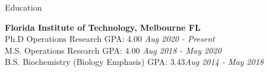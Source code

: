 \documentclass{resume} %
\begin{document}


\begin{rSection}{Education}

    {\bf Florida Institute of Technology, Melbourne FL}
    \\ Ph.D Operations Research  GPA: 4.00 \hfill {\em Aug 2020 - Present}
    \\ M.S. Operations Research  GPA: 4.00 \hfill {\em Aug 2018 - May 2020}
    \\ B.S. Biochemistry (Biology Emphasis)    GPA: 3.43\hfill {\em Aug 2014 - May 2018}
\end{rSection}



\end{document}
